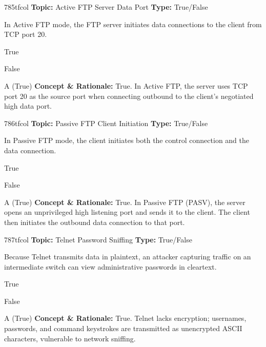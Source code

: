 \begin{qcard}{785}{tfcol}
\textcolor{darkslate!75}{\small\textbf{Topic:} Active FTP Server Data Port \hfill \textbf{Type:} True/False}\vspace{0.4em}\par
In Active FTP mode, the FTP server initiates data connections to the client from TCP port 20.
\begin{qoptions}
\item True
\item False
\end{qoptions}
\end{qcard}
\nopagebreak
\begin{explainbox}{A (True)}
\textbf{Concept \& Rationale:} True. In Active FTP, the server uses TCP port 20 as the source port when connecting outbound to the client's negotiated high data port.
\end{explainbox}

\begin{qcard}{786}{tfcol}
\textcolor{darkslate!75}{\small\textbf{Topic:} Passive FTP Client Initiation \hfill \textbf{Type:} True/False}\vspace{0.4em}\par
In Passive FTP mode, the client initiates both the control connection and the data connection.
\begin{qoptions}
\item True
\item False
\end{qoptions}
\end{qcard}
\nopagebreak
\begin{explainbox}{A (True)}
\textbf{Concept \& Rationale:} True. In Passive FTP (PASV), the server opens an unprivileged high listening port and sends it to the client. The client then initiates the outbound data connection to that port.
\end{explainbox}

\begin{qcard}{787}{tfcol}
\textcolor{darkslate!75}{\small\textbf{Topic:} Telnet Password Sniffing \hfill \textbf{Type:} True/False}\vspace{0.4em}\par
Because Telnet transmits data in plaintext, an attacker capturing traffic on an intermediate switch can view administrative passwords in cleartext.
\begin{qoptions}
\item True
\item False
\end{qoptions}
\end{qcard}
\nopagebreak
\begin{explainbox}{A (True)}
\textbf{Concept \& Rationale:} True. Telnet lacks encryption; usernames, passwords, and command keystrokes are transmitted as unencrypted ASCII characters, vulnerable to network sniffing.
\end{explainbox}

